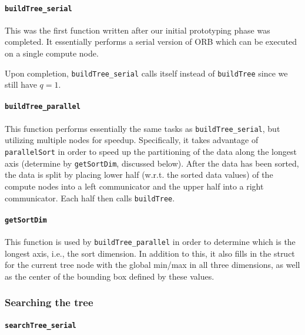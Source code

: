 \documentclass{article}
\begin{document}
\paragraph{\texttt{buildTree\_serial}}
This was the first function written after our initial prototyping phase was completed. It essentially performs a serial version of ORB which can be executed on a single compute node.


Upon completion, \texttt{buildTree\_serial} calls itself instead of \texttt{buildTree} since we still have $q=1$.


\paragraph{\texttt{buildTree\_parallel}}
This function performs essentially the same tasks as \texttt{buildTree\_serial}, but utilizing multiple nodes for speedup. Specifically, it takes advantage of \texttt{parallelSort} in order to speed up the partitioning of the data along the longest axis (determine by \texttt{getSortDim}, discussed below). After the data has been sorted, the data is split by placing lower half (w.r.t. the sorted data values) of the compute nodes into a left communicator and the upper half into a right communicator. Each half then calls \texttt{buildTree}.



\paragraph{\texttt{getSortDim}}
This function is used by \texttt{buildTree\_parallel} in order to determine which is the longest axis, i.e., the sort dimension. In addition to this, it also fills in the struct for the current tree node with the global min/max in all three dimensions, as well as the center of the bounding box defined by these values.


\subsubsection{Searching the tree}

\paragraph{\texttt{searchTree\_serial}}
\end{document}
